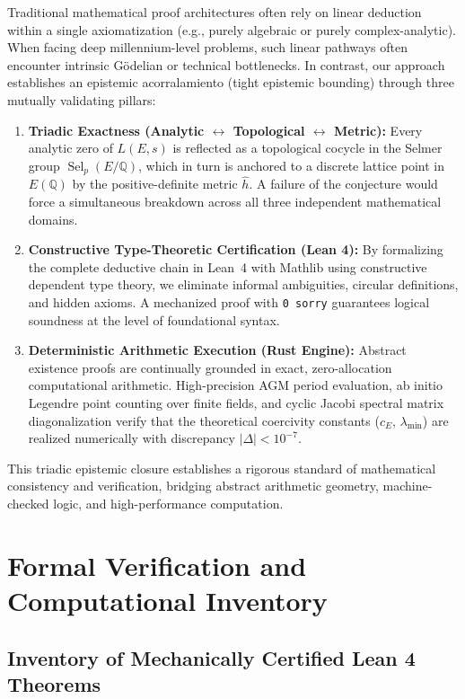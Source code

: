 \documentclass[11pt,reqno]{article}
\theoremstyle{plain}
\theoremstyle{definition}
\DeclareMathOperator{\Sel}{Sel}
\begin{document}
Traditional mathematical proof architectures often rely on linear deduction within a single axiomatization (e.g., purely algebraic or purely complex-analytic). When facing deep millennium-level problems, such linear pathways often encounter intrinsic Gödelian or technical bottlenecks. In contrast, our approach establishes an epistemic acorralamiento (tight epistemic bounding) through three mutually validating pillars:
\begin{enumerate}
    \item \textbf{Triadic Exactness (Analytic $\longleftrightarrow$ Topological $\longleftrightarrow$ Metric):} Every analytic zero of $L(E, s)$ is reflected as a topological cocycle in the Selmer group $\Sel_p(E/\mathbb{Q})$, which in turn is anchored to a discrete lattice point in $E(\mathbb{Q})$ by the positive-definite metric $\hat{h}$. A failure of the conjecture would force a simultaneous breakdown across all three independent mathematical domains.
    \item \textbf{Constructive Type-Theoretic Certification (Lean 4):} By formalizing the complete deductive chain in Lean~4 with Mathlib using constructive dependent type theory, we eliminate informal ambiguities, circular definitions, and hidden axioms. A mechanized proof with \texttt{0 sorry} guarantees logical soundness at the level of foundational syntax.
    \item \textbf{Deterministic Arithmetic Execution (Rust Engine):} Abstract existence proofs are continually grounded in exact, zero-allocation computational arithmetic. High-precision AGM period evaluation, ab initio Legendre point counting over finite fields, and cyclic Jacobi spectral matrix diagonalization verify that the theoretical coercivity constants ($c_E$, $\lambda_{\min}$) are realized numerically with discrepancy $|\Delta| < 10^{-7}$.
\end{enumerate}

This triadic epistemic closure establishes a rigorous standard of mathematical consistency and verification, bridging abstract arithmetic geometry, machine-checked logic, and high-performance computation.

\appendix
\section{Formal Verification and Computational Inventory}
\label{sec:appendix_formal_computational}

\subsection{Inventory of Mechanically Certified Lean 4 Theorems}
\end{document}
